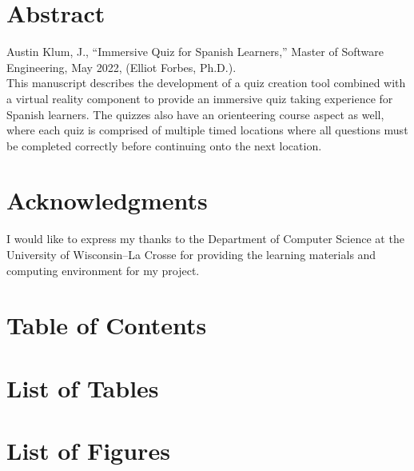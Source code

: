 \documentclass[letterpaper,12pt]{report}
\begin{document}
\hypersetup{pageanchor=false}
	
\clearpage


\clearpage

\hypersetup{pageanchor=true}
\setcounter{page}{1}
\renewcommand\arraystretch{1.5}
\section*{Abstract}
Austin Klum, J., ``Immersive Quiz for Spanish Learners,'' Master of Software Engineering, May 2022, (Elliot Forbes, Ph.D.). \\


This manuscript describes the development of a quiz creation tool combined with a virtual reality component to provide an immersive quiz taking experience for Spanish learners. The quizzes also have an orienteering course aspect as well, where each quiz is comprised of multiple timed locations where all questions must be completed correctly before continuing onto the next location. 
\clearpage

\section*{Acknowledgments}
I would like to express my thanks to the Department of Computer Science at the University of Wisconsin--La Crosse for providing the learning materials and computing environment for my project.
\clearpage

\section*{Table of Contents}
\tableofcontents
\clearpage


\section*{List of Tables}
\listoftables
\clearpage

\section*{List of Figures}
\listoffigures
\clearpage
\end{document}
